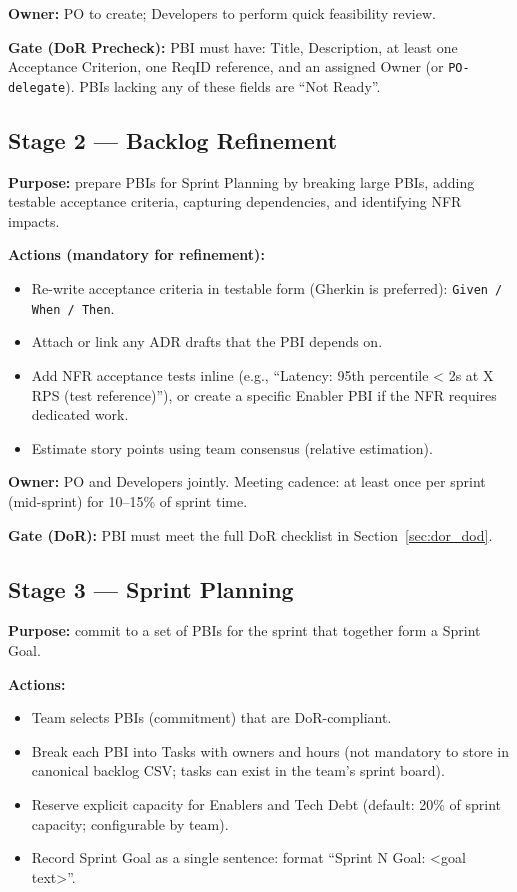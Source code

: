 \documentclass[11pt,a4paper]{article}
\begin{document}
\textbf{Owner:} PO to create; Developers to perform quick feasibility review.

\textbf{Gate (DoR Precheck):} PBI must have: Title, Description, at least one Acceptance Criterion, one ReqID reference, and an assigned Owner (or \texttt{PO-delegate}). PBIs lacking any of these fields are ``Not Ready''.

\subsection{Stage 2 — Backlog Refinement}
\textbf{Purpose:} prepare PBIs for Sprint Planning by breaking large PBIs, adding testable acceptance criteria, capturing dependencies, and identifying NFR impacts.

\textbf{Actions (mandatory for refinement):}
\begin{itemize}
  \item Re-write acceptance criteria in testable form (Gherkin is preferred): \texttt{Given / When / Then}.
  \item Attach or link any ADR drafts that the PBI depends on.
  \item Add NFR acceptance tests inline (e.g., ``Latency: 95th percentile < 2s at X RPS (test reference)''), or create a specific Enabler PBI if the NFR requires dedicated work.
  \item Estimate story points using team consensus (relative estimation).
\end{itemize}

\textbf{Owner:} PO and Developers jointly. Meeting cadence: at least once per sprint (mid-sprint) for 10–15\% of sprint time.

\textbf{Gate (DoR):} PBI must meet the full DoR checklist in Section~\ref{sec:dor_dod}.

\subsection{Stage 3 — Sprint Planning}
\textbf{Purpose:} commit to a set of PBIs for the sprint that together form a Sprint Goal.

\textbf{Actions:}
\begin{itemize}
  \item Team selects PBIs (commitment) that are DoR-compliant.
  \item Break each PBI into Tasks with owners and hours (not mandatory to store in canonical backlog CSV; tasks can exist in the team's sprint board).
  \item Reserve explicit capacity for Enablers and Tech Debt (default: 20\% of sprint capacity; configurable by team).
  \item Record Sprint Goal as a single sentence: format ``Sprint N Goal: \textless goal text\textgreater''.
\end{itemize}
\end{document}
